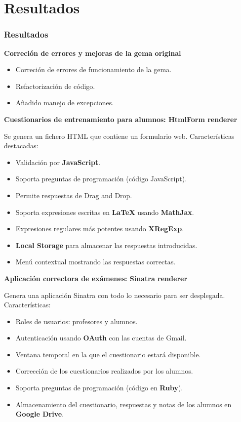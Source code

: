 \documentclass{beamer}
\begin{document}
\section{Resultados}
\begin{frame}[allowframebreaks]
  \frametitle{Resultados}
  
  {\bfseries Correción de errores y mejoras de la gema original}
  \bigskip
  
  \begin{itemize}
    \item Correción de errores de funcionamiento de la gema.
    \item Refactorización de código.
    \item Añadido manejo de excepciones.
  \end{itemize}
  \framebreak
  
  {\bfseries Cuestionarios de entrenamiento para alumnos: HtmlForm renderer}
  \bigskip
  
  Se genera un fichero HTML que contiene un formulario web. Características destacadas:
  \begin{itemize}
    \item Validación por {\bfseries JavaScript}.
    \item Soporta preguntas de programación (código JavaScript).
    \item Permite respuestas de Drag and Drop.
    \item Soporta expresiones escritas en {\bfseries LaTeX} usando {\bfseries MathJax}.
    \item Expresiones regulares más potentes usando {\bfseries XRegExp}.
    \item {\bfseries Local Storage} para almacenar las respuestas introducidas.
    \item Menú contextual mostrando las respuestas correctas.
  \end{itemize}
  \framebreak
  
  {\bfseries Aplicación correctora de exámenes: Sinatra renderer}
  \bigskip
  
  Genera una aplicación Sinatra con todo lo necesario para ser desplegada.
  Características:
  \begin{itemize}
    \item Roles de usuarios: profesores y alumnos.
    \item Autenticación usando {\bfseries OAuth} con las cuentas de Gmail.
    \item Ventana temporal en la que el cuestionario estará disponible.
    \item Corrección de los cuestionarios realizados por los alumnos.
    \item Soporta preguntas de programación (código en {\bfseries Ruby}).
    \item Almacenamiento del cuestionario, respuestas y notas de los alumnos en {\bfseries Google Drive}.
  \end{itemize}
\end{frame}
\end{document}
